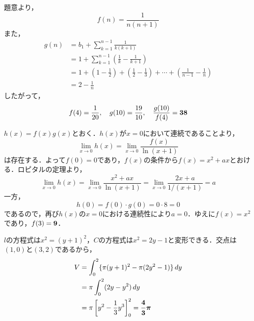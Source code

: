 \documentclass[fleqn,twocolumn,9pt]{jsarticle}
\begin{document}

\Question  %
題意より，
\begin{equation*}
  f(n) = \frac{1}{n(n+1)}
\end{equation*}
また，
\begin{align*}
  g(n) &= b_1 + \sum_{k=1}^{n-1} \frac{1}{k(k+1)} \\
  &= 1 + \sum_{k=1}^{n-1} \left(\frac{1}{k} - \frac{1}{k+1}\right) \\
  &= 1 + \left(1 - \frac{1}{2}\right) + \left(\frac{1}{2} - \frac{1}{3}\right) + \cdots + \left(\frac{1}{n-1} - \frac{1}{n}\right) \\
  &= 2 - \frac{1}{n}
\end{align*}
したがって，
\begin{equation*}
  f(4) = \frac{1}{20}, \quad g(10) = \frac{19}{10}, \quad \frac{g(10)}{f(4)} = \boldsymbol{38}
\end{equation*}


\Question  %
$h(x)=f(x)g(x)$とおく．$h(x)$が$x=0$において連続であることより，
\begin{equation*}
  \lim_{x \to 0} h(x) = \lim_{x \to 0} \frac{f(x)}{\ln (x+1)}
\end{equation*}
は存在する．よって$f(0)=0$であり，$f(x)$の条件から$f(x)=x^2+ax$とおける．ロピタルの定理より，
\begin{equation*}
  \lim_{x \to 0} h(x) = \lim_{x \to 0} \frac{x^2+ax}{\ln (x+1)} = \lim_{x \to 0} \frac{2x+a}{1/(x+1)} = a
\end{equation*}
一方，
\begin{equation*}
  h(0) = f(0) \cdot g(0) = 0 \cdot 8 = 0
\end{equation*}
であるので，再び$h(x)$の$x=0$における連続性により$a=0$．ゆえに$f(x)=x^2$であり，$f(3)=\boldsymbol{9}$．


\Question  %
$l$の方程式は$x^2=(y+1)^2$，$C$の方程式は$x^2=2y-1$と変形できる．交点は$(1,0)$と$(3,2)$であるから，
\begin{align*}
  V &= \int_0^2 \{ \pi (y+1)^2 - \pi (2y^2-1) \} \, dy \\
  &= \pi \int_0^2 (2y - y^2) \, dy \\
  &= \pi \left[ y^2 - \frac{1}{3}y^3 \right]_0^2 = \boldsymbol{\frac{4}{3}\pi}
\end{align*}

\end{document}
